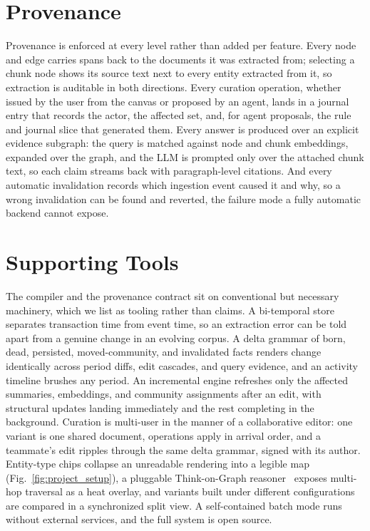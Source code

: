 \documentclass[sigconf]{acmart}
\begin{document}
\section{Provenance}
Provenance is enforced at every level rather than added per feature. Every node and edge carries spans back to the documents it was extracted from; selecting a chunk node shows its source text next to every entity extracted from it, so extraction is auditable in both directions. Every curation operation, whether issued by the user from the canvas or proposed by an agent, lands in a journal entry that records the actor, the affected set, and, for agent proposals, the rule and journal slice that generated them. Every answer is produced over an explicit evidence subgraph: the query is matched against node and chunk embeddings, expanded over the graph, and the LLM is prompted only over the attached chunk text, so each claim streams back with paragraph-level citations. And every automatic invalidation records which ingestion event caused it and why, so a wrong invalidation can be found and reverted, the failure mode a fully automatic backend cannot expose.

\section{Supporting Tools}
The compiler and the provenance contract sit on conventional but necessary machinery, which we list as tooling rather than claims. A bi-temporal store separates transaction time from event time, so an extraction error can be told apart from a genuine change in an evolving corpus. A delta grammar of born, dead, persisted, moved-community, and invalidated facts renders change identically across period diffs, edit cascades, and query evidence, and an activity timeline brushes any period. An incremental engine refreshes only the affected summaries, embeddings, and community assignments after an edit, with structural updates landing immediately and the rest completing in the background. Curation is multi-user in the manner of a collaborative editor: one variant is one shared document, operations apply in arrival order, and a teammate's edit ripples through the same delta grammar, signed with its author. Entity-type chips collapse an unreadable rendering into a legible map (Fig.~\ref{fig:project_setup}), a pluggable Think-on-Graph reasoner~\cite{sun2024thinkongraph} exposes multi-hop traversal as a heat overlay, and variants built under different configurations are compared in a synchronized split view. A self-contained batch mode runs without external services, and the full system is open source.
\end{document}
